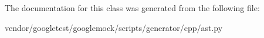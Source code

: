 The documentation for this class was generated from the following file\+:\begin{DoxyCompactItemize}
\item 
vendor/googletest/googlemock/scripts/generator/cpp/ast.\+py\end{DoxyCompactItemize}

